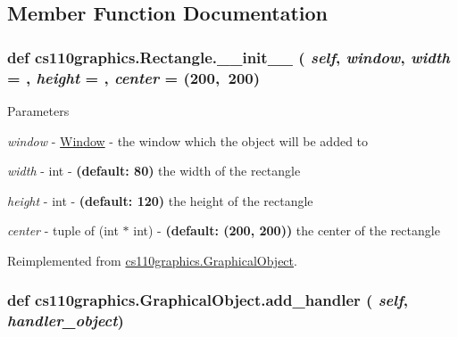\subsection{Member Function Documentation}
\hypertarget{classcs110graphics_1_1Rectangle_a57049aac9a7f4aa8823112290888a6a8}{
\subsubsection[{\_\-\_\-init\_\-\_\-}]{\setlength{\rightskip}{0pt plus 5cm}def cs110graphics.Rectangle.\_\-\_\-init\_\-\_\- ( {\em self}, \/   {\em window}, \/   {\em width} = {}, \/   {\em height} = {}, \/   {\em center} = {\ttfamily (200,~200})}}
\label{classcs110graphics_1_1Rectangle_a57049aac9a7f4aa8823112290888a6a8}

\begin{DoxyParams}{Parameters}
\item[{\em window}]-\/ \hyperlink{classcs110graphics_1_1Window}{Window} -\/ the window which the object will be added to \item[{\em width}]-\/ int -\/ {\bfseries (default: 80)} the width of the rectangle \item[{\em height}]-\/ int -\/ {\bfseries (default: 120)} the height of the rectangle \item[{\em center}]-\/ tuple of (int $\ast$ int) -\/ {\bfseries (default: (200, 200))} the center of the rectangle \end{DoxyParams}


Reimplemented from \hyperlink{classcs110graphics_1_1GraphicalObject}{cs110graphics.GraphicalObject}.\hypertarget{classcs110graphics_1_1GraphicalObject_adb1af0d5a6baae3f9a08d21a3227c49f}{
\subsubsection[{add\_\-handler}]{\setlength{\rightskip}{0pt plus 5cm}def cs110graphics.GraphicalObject.add\_\-handler ( {\em self}, \/   {\em handler\_\-object})}}
\label{classcs110graphics_1_1GraphicalObject_adb1af0d5a6baae3f9a08d21a3227c49f}


